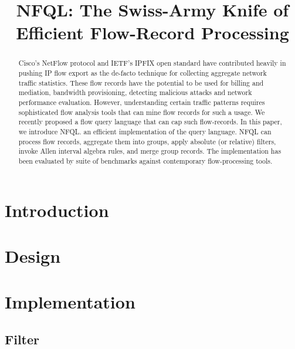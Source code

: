 \documentclass[conference]{IEEEtran}
\begin{document}
\title{NFQL: The Swiss-Army Knife of Efficient Flow-Record Processing}

\author{ }

\maketitle


\begin{abstract} Cisco's NetFlow protocol and IETF's IPFIX open standard have
  contributed heavily in pushing IP flow export as the de-facto technique for
  collecting aggregate network traffic statistics. These flow records have the
  potential to be used for billing and mediation, bandwidth provisioning,
  detecting malicious attacks and network performance evaluation. However,
  understanding certain traffic patterns requires sophisticated flow analysis
  tools that can mine flow records for such a usage. We recently proposed a
  flow query language that can cap such flow-records. In this paper, we
  introduce \ac{NFQL}. an efficient implementation of the query language.
  \ac{NFQL} can process flow records, aggregate them into groups, apply
  absolute (or relative) filters, invoke Allen interval algebra rules, and
  merge group records. The implementation has been evaluated by suite of
  benchmarks against contemporary flow-processing tools.\end{abstract}



\section{Introduction}

\section{Design}

\section{Implementation}
  \subsection{Filter}
\end{document}
